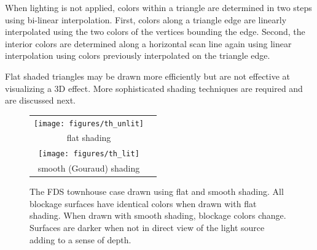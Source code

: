 \documentclass[11pt,twoside]{book}
\begin{document}
When lighting is not applied, colors within a triangle are
determined in two steps using bi-linear interpolation. First,
colors along a triangle edge are linearly interpolated using the
two colors of the vertices bounding the edge. Second, the interior
colors are determined along a horizontal scan line again using
linear interpolation using colors previously interpolated on the
triangle edge.

Flat shaded triangles may be drawn more efficiently but are not
effective at visualizing a 3D effect.  More sophisticated shading
techniques are required and are discussed next.

\begin{figure}[t]
\begin{center}
\begin{tabular}{cc}
\texttt{[image: figures/th\_unlit]}\\
flat shading\\
\texttt{[image: figures/th\_lit]}\\
smooth (Gouraud) shading\\
\end{tabular}
\end{center}
\caption [The FDS townhouse case drawn using flat and smooth
shading.] { The FDS townhouse case drawn using flat and smooth
shading. All blockage surfaces have identical colors when drawn
with flat shading.  When drawn with smooth shading, blockage
colors change.  Surfaces are darker when not in direct view of the
light source adding to a sense of depth. } \label{figlighting}
\end{figure}
\end{document}
